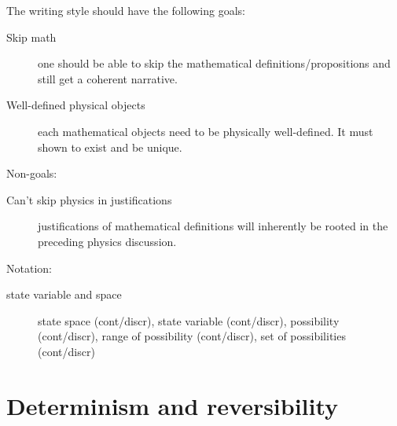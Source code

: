 \documentclass[aps,pra,10pt,twocolumn,floatfix,nofootinbib]{revtex4-1}
\theoremstyle{definition}
\begin{document}
The writing style should have the following goals:
\begin{description}
  \item[Skip math] one should be able to skip the mathematical definitions/propositions and still get a coherent narrative.
  \item[Well-defined physical objects] each mathematical objects need to be physically well-defined. It must shown to exist and be unique.
\end{description}
Non-goals:
\begin{description}
  \item[Can't skip physics in justifications] justifications of mathematical definitions will inherently be rooted in the preceding physics discussion.
\end{description}
Notation:
\begin{description}
  \item[state variable and space] state space (cont/discr), state variable (cont/discr), possibility (cont/discr), range of possibility (cont/discr), set of possibilities (cont/discr)
\end{description}

\section{Determinism and reversibility}

\end{document}

